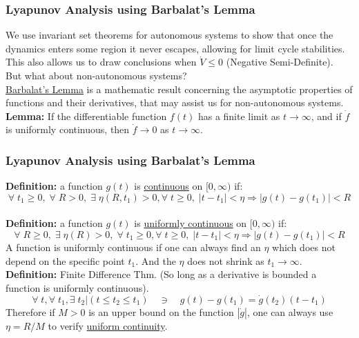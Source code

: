 \documentclass[11pt,handout]{beamer}   %
\begin{document}


\begin{frame}
\frametitle{Lyapunov Analysis using Barbalat's Lemma}
\small
We use invariant set theorems for autonomous systems to show that once the dynamics enters some region it never escapes, allowing for limit cycle stabilities. This also allows us to draw conclusions when $\dot{V} \leq 0$ (Negative Semi-Definite).\\
\vspace{6pt}
But what about non-autonomous systems?\\
\vspace{6pt}
\underline{Barbalat's Lemma} is a mathematic result concerning the asymptotic properties of functions and their derivatives, that may assist us for non-autonomous systems.\\
\vspace{6pt}
\textbf{Lemma:} If the differentiable function $f(t)$ has a finite limit as $t \rightarrow \infty$, and if $\dot{f}$ is uniformly continuous, then $\dot{f} \rightarrow 0 $ as $t \rightarrow \infty$.
\end{frame}

\begin{frame}
\frametitle{Lyapunov Analysis using Barbalat's Lemma}
\small
\textbf{Definition:} a function $g(t)$ is \underline{continuous} on $
[0,\infty)$ if:
\begin{equation*}
\forall \; t_1 \geq 0, \; \forall \; R > 0, \; \exists \; \eta(R,t_1)>0, \forall \; t \geq 0, \; |t-t_1| < \eta \Rightarrow |g(t) - g(t_1)| < R
\end{equation*}\\
\textbf{Definition:} a function $g(t)$ is \underline{uniformly continuous} on $
[0,\infty)$ if:
\begin{equation*}
\forall \; R \geq 0, \; \exists \; \eta(R) > 0, \; \forall \; t_1 \geq 0, \forall \; t \geq 0, \; |t-t_1| < \eta \Rightarrow |g(t) - g(t_1)| < R
\end{equation*}
A function is uniformly continuous if one can always find an $\eta$ which does not depend on the specific point $t_1$. And the $\eta$ does not shrink as $t_1 \rightarrow \infty$.\\
\vspace{6pt}
\textbf{Definition:} Finite Difference Thm. (So long as a derivative is bounded a function is uniformly continuous).
\begin{equation*}
\forall \; t, \forall \; t_1, \exists \; t_2 | (t \leq t_2 \leq t_1) \quad \ni  \quad g(t) - g(t_1) = \dot{g}(t_2) (t - t_1)
\end{equation*}
Therefore if $M>0$ is an upper bound on the function $|\dot{g}|$, one can always use $\eta = R/M$ to verify \underline{uniform continuity}.
\end{frame}
\end{document}
